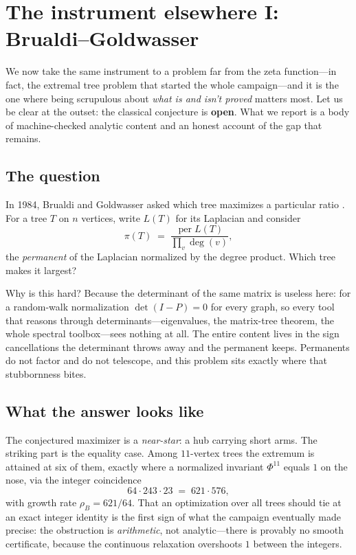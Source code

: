\section{The instrument elsewhere I: Brualdi--Goldwasser}
\label{sec:bg}

We now take the same instrument to a problem far from the zeta function---in
fact, the extremal tree problem that started the whole campaign---and it is the
one where being scrupulous about \emph{what is and isn't proved} matters most.
Let us be clear at the outset: the classical conjecture is \textbf{open}. What we
report is a body of machine-checked analytic content and an honest account of the
gap that remains.

\subsection{The question}

In 1984, Brualdi and Goldwasser asked which tree maximizes a particular ratio
\cite{brualdi1984}. For a tree $T$ on $n$ vertices, write $L(T)$ for its
Laplacian and consider
\[
  \pi(T) \;=\; \frac{\operatorname{per} L(T)}{\prod_{v} \deg(v)},
\]
the \emph{permanent} of the Laplacian normalized by the degree product. Which
tree makes it largest?

Why is this hard? Because the determinant of the same matrix is useless here: for
a random-walk normalization $\det(I - P) = 0$ for every graph, so every tool that
reasons through determinants---eigenvalues, the matrix-tree theorem, the whole
spectral toolbox---sees nothing at all. The entire content lives in the sign
cancellations the determinant throws away and the permanent keeps. Permanents do
not factor and do not telescope, and this problem sits exactly where that
stubbornness bites.

\subsection{What the answer looks like}

The conjectured maximizer is a \emph{near-star}: a hub carrying short arms. The
striking part is the equality case. Among $11$-vertex trees the extremum is
attained at six of them, exactly where a normalized invariant $\Phi^{11}$ equals
$1$ on the nose, via the integer coincidence
\[
  64 \cdot 243 \cdot 23 \;=\; 621 \cdot 576,
\]
with growth rate $\rho_B = 621/64$. That an optimization over all trees should tie
at an exact integer identity is the first sign of what the campaign eventually
made precise: the obstruction is \emph{arithmetic}, not analytic---there is
provably no smooth certificate, because the continuous relaxation overshoots $1$
between the integers.

